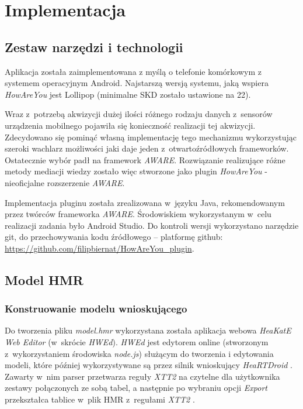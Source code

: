 \chapter{Implementacja}
\label{cha:implementacja}


\section{Zestaw narzędzi i technologii}
\label{sec:zestawNardzedziITechnologii}

Aplikacja została zaimplementowana z myślą o telefonie komórkowym z systemem operacyjnym Android. Najstarszą wersją systemu, jaką wspiera \textit{HowAreYou} jest Lollipop (minimalne SKD zostało ustawione na 22). 

Wraz z~potrzebą akwizycji dużej ilości różnego rodzaju danych z~sensorów urządzenia mobilnego pojawiła się konieczność realizacji tej akwizycji. Zdecydowano się pominąć własną implementację tego mechanizmu wykorzystując szeroki wachlarz możliwości jaki daje jeden z~otwartoźródłowych frameworków. Ostatecznie wybór padł na framework \textit{AWARE}. Rozwiązanie realizujące różne metody mediacji wiedzy zostało więc stworzone jako plugin \textit{HowAreYou} - nieoficjalne rozszerzenie \textit{AWARE}.

Implementacja pluginu została zrealizowana w~języku Java, rekomendowanym przez twórców frameworka \textit{AWARE}\cite{AwareFramework}. Środowiskiem wykorzystanym w~celu realizacji zadania było Android Studio. Do kontroli wersji wykorzystano narzędzie git, do przechowywania kodu źródłowego -- platformę github: \url{https://github.com/filipbiernat/HowAreYou_plugin}.


\section{Model HMR}
\label{sec:modelHmr2}

\subsection{Konstruowanie modelu wnioskującego}

Do tworzenia pliku \textit{model.hmr} wykorzystana została aplikacja webowa \textit{HeaKatE Web Editor} (w~skrócie \textit{HWEd}). \textit{HWEd} jest edytorem online (stworzonym z~wykorzystaniem środowiska \textit{node.js}) służącym do tworzenia i edytowania modeli, które później wykorzystywane są przez silnik wnioskujący \textit{HeaRTDroid} \cite{heartdroid}. Zawarty w~nim parser przetwarza reguły \textit{XTT2} na czytelne dla użytkownika zestawy połączonych ze sobą tabel, a następnie po wybraniu opcji \textit{Export} przekształca tablice w~plik HMR z~regułami \textit{XTT2} \cite{heartdroid}.

